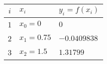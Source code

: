 \documentclass[letterpaper, 12pt]{article}
\begin{document}
\begin{center}
\begin{tabular}{cll} %
$i$ & $x_i$ & $y_i=f(x_i)$ \\ \midrule
1 & $x_0=0$ & $0$ \\
2 & $x_1=0.75$ & $-0.0409838$ \\
3 & $x_2=1.5$ & $1.31799$ \\ \bottomrule
\end{tabular}
\end{center}
\end{document}
